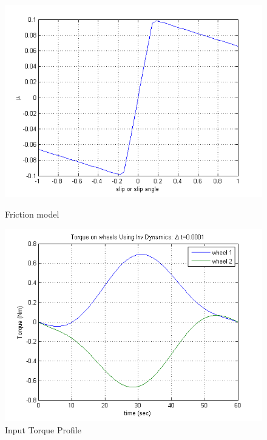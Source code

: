 {\begin{figure}
	\begin{minipage}[t]{0.5\textwidth}
		\centering
		\includegraphics[width=\textwidth]{Chapter4/fig/frictionVsSlip}
		\caption{Friction model}\label{fig:friction_Slip}
	\end{minipage}
	\hfill
	\begin{minipage}[t]{0.5\textwidth}
		\centering
		\includegraphics[width=\textwidth]{Chapter4/fig/InputTorqueProfile}
		\caption{Input Torque Profile }\label{fig:InputTorqueProfile}
	\end{minipage}
\end{figure}
\ 
}
